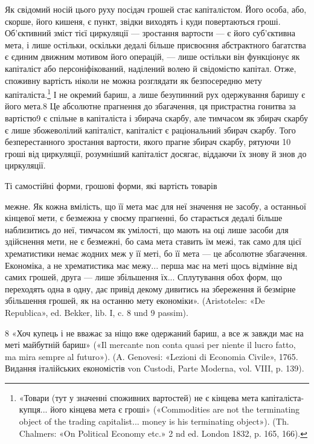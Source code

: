 Як свідомий носій цього руху посідач грошей стає капіталістом.
Його особа, або, скорше, його кишеня, є пункт, звідки виходять
і куди повертаються гроші. Об’єктивний зміст тієї циркуляції
— зростання вартости — є його суб’єктивна мета, і лише
остільки, оскільки дедалі більше присвоєння абстрактного багатства
є єдиним движним мотивом його операцій, — лише остільки
він функціонує як капіталіст або персоніфікований, наділений
волею й свідомістю капітал. Отже, споживну вартість ніколи не
можна розглядати як безпосередню мету капіталіста.\footnote{
«Товари (тут у значенні споживних вартостей) не є кінцева мета
капіталіста-купця... його кінцева мета є гроші» («Commodities are
not the terminating object of the trading capitalist... money is his terminating
object»). (Th. Chalmers: «On Political Economy etc.» 2 nd ed. London
1832, p. 165, 166).
} І не окремий
бариш, а лише безупинний рух одержування баришу є його
мета.8 Це абсолютне прагнення до збагачення, ця пристрастна
гонитва за вартістю9 є спільне в капіталіста і збирача скарбу,
але тимчасом як збирач скарбу є лише збожеволілий капіталіст,
капіталіст є раціональний збирач скарбу. Того безперестанного
зростання вартости, якого прагне збирач скарбу, рятуючи 10  гроші
від циркуляції, розумніший капіталіст досягає, віддаючи їх знову
й знов до циркуляції.

Ті самостійні форми, грошові форми, які вартість товарів

межне. Як кожна вмілість, що її мета має для неї значення не засобу,
а останньої кінцевої мети, є безмежна у своєму прагненні, бо старається
дедалі більше наблизитись до неї, тимчасом як умілості, що мають на оці
лише засоби для здійснення мети, не є безмежні, бо сама мета ставить їм
межі, так само для цієї хрематистики немає жодних меж у її меті, бо її
мета — це абсолютне збагачення. Економіка, а не хрематистика має
межу... перша має на меті щось відмінне від самих грошей, друга — лише
збільшення їх... Сплутування обох форм, що переходять одна в одну, дає
привід декому дивитись на збереження й безмірне збільшення грошей,
як на останню мету економіки». (Aristoteles: «De Republica», ed. Bekker,
lib. I, c. 8 und 9 passim).

8 «Хоч купець і не вважає за ніщо вже одержаний бариш, а все ж
завжди має на меті майбутній бариш» («Il mercante non conta quasi per
niente il lucro fatto, ma mira sempre al futuro»). (A. Genovesi: «Lezioni
di Economia Civile», 1765. Видання італійських економістів von Custodi,
Parte Moderna, vol. VIII, p. 139).

